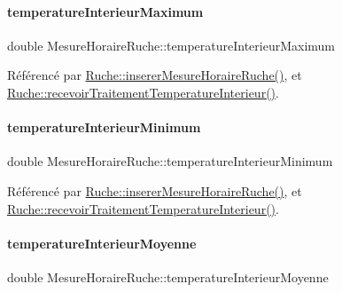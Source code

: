 \paragraph{\texorpdfstring{temperature\+Interieur\+Maximum}{temperatureInterieurMaximum}}
{\footnotesize\ttfamily double Mesure\+Horaire\+Ruche\+::temperature\+Interieur\+Maximum}



Référencé par \hyperlink{class_ruche_a3a093c088d9c97f347394c8a681f7302}{Ruche\+::inserer\+Mesure\+Horaire\+Ruche()}, et \hyperlink{class_ruche_a2d2a681916140b977d45423d0d5d7b34}{Ruche\+::recevoir\+Traitement\+Temperature\+Interieur()}.

\mbox{\label{struct_mesure_horaire_ruche_a51c45378a78c733704df79b38d61afcc}} 
\paragraph{\texorpdfstring{temperature\+Interieur\+Minimum}{temperatureInterieurMinimum}}
{\footnotesize\ttfamily double Mesure\+Horaire\+Ruche\+::temperature\+Interieur\+Minimum}



Référencé par \hyperlink{class_ruche_a3a093c088d9c97f347394c8a681f7302}{Ruche\+::inserer\+Mesure\+Horaire\+Ruche()}, et \hyperlink{class_ruche_a2d2a681916140b977d45423d0d5d7b34}{Ruche\+::recevoir\+Traitement\+Temperature\+Interieur()}.

\mbox{\label{struct_mesure_horaire_ruche_ac240bf701116e1a09f2bf33911bf57ef}} 
\paragraph{\texorpdfstring{temperature\+Interieur\+Moyenne}{temperatureInterieurMoyenne}}
{\footnotesize\ttfamily double Mesure\+Horaire\+Ruche\+::temperature\+Interieur\+Moyenne}



